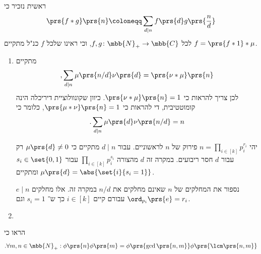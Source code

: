 \documentclass[a4paper,10pt,twoside,openany]{book}
\begin{document}
\begin{solution}
ראשית נזכיר כי
\begin{align*}
\prs{f * g}\prs{n} \coloneqq \sum_{d \mid n} f\prs{d} g\prs{\frac{n}{d}}
\end{align*}
לכל
$f,g \colon \mbb{N}_+ \to \mbb{C}$,
וכי ראינו שלכל
$f$
כנ"ל מתקיים
$f = \prs{f * 1} * \mu$.

\begin{enumerate}[label = (\alph*)]
\item
מתקיים
\[\text{,} \sum_{d \mid n} \mu\prs{n/d} \nu\prs{d} = \prs{\nu * \mu}\prs{n}\]
לכן צריך להראות כי
$\prs{\nu * \mu}\prs{n} = 1$.
כיוון שקונוולוציית דיריכלה הינה קומוטטיבית, די להראות כי
$\prs{\mu * \nu}\prs{n} = 1$,
כלומר כי
\[\text{.} \sum_{d \mid n} \mu\prs{d} \nu\prs{n/d} = n\]

יהי
$n = \prod_{i \in [k]} p_i^{r_i}$
פירוק של
$n$
לראשוניים.
עבור
$d \mid n$
מתקיים כי
$\mu\prs{d} \neq 0$
רק עבור
$d$
חסר ריבועים.
במקרה זה
$d$
מהצורה
$\prod_{i \in [k]} p_i^{s_i}$
עבור
$s_i \in \set{0,1}$
ומתקיים
$\mu\prs{d} = \abs{\set{i}{s_i = 1}}$.

נספור את המחלקים של
$n$
שאינם מחלקים את
$n/d$
במקרה זה.
אלו מחלקים
$e \mid n$
עבורם קיים
$i \in [k]$
כך ש־%
$s_i = 1$
וגם
$\ord_{p_i}\prs{e} = r_i$.


\item
\end{enumerate}
\end{solution}

\begin{exercisechap}
הראו כי
\[\text{.} \forall m,n \in \mbb{N}_+ : \phi\prs{n} \phi\prs{m} = \phi\prs{\gcd\prs{n,m}} \phi\prs{\lcm\prs{n,m}}\]
\end{exercisechap}
\end{document}
